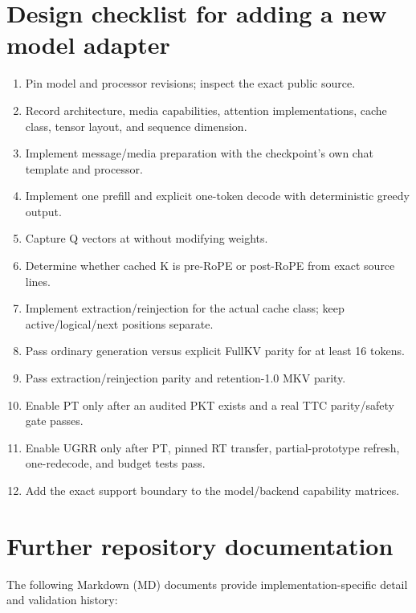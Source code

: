 \documentclass[11pt]{article}
\newcommand{\code}[1]{\texttt{\detokenize{#1}}}
\begin{document}
\section{Design checklist for adding a new model adapter}

\begin{enumerate}
  \item Pin model and processor revisions; inspect the exact public source.
  \item Record architecture, media capabilities, attention implementations, cache class, tensor
        layout, and sequence dimension.
  \item Implement message/media preparation with the checkpoint's own chat template and processor.
  \item Implement one prefill and explicit one-token decode with deterministic greedy output.
  \item Capture Q vectors at \code{q_proj} without modifying weights.
  \item Determine whether cached K is pre-RoPE or post-RoPE from exact source lines.
  \item Implement extraction/reinjection for the actual cache class; keep active/logical/next
        positions separate.
  \item Pass ordinary generation versus explicit FullKV parity for at least 16 tokens.
  \item Pass extraction/reinjection parity and retention-1.0 MKV parity.
  \item Enable PT only after an audited PKT exists and a real TTC parity/safety gate passes.
  \item Enable UGRR only after PT, pinned RT transfer, partial-prototype refresh, one-redecode, and
        budget tests pass.
  \item Add the exact support boundary to the model/backend capability matrices.
\end{enumerate}

\section{Further repository documentation}

The following Markdown (MD) documents provide implementation-specific detail and validation
history:
\end{document}
